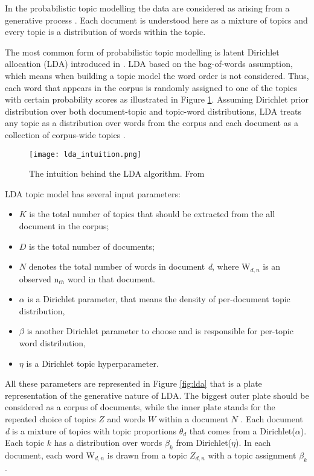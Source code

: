 \documentclass[fontsize=12pt,a4paper,twoside,openany]{scrbook}
\begin{document}
In the probabilistic topic modelling the data are considered as arising from a generative process \parencite{Blei12}. Each document is understood here as a mixture of topics and every topic is a distribution of words within the topic. 

The most common form of probabilistic topic modelling is latent Dirichlet allocation (LDA) introduced in \parencite{Blei03}. LDA based on the bag-of-words assumption, which means when building a topic model the word order is not considered. Thus, each word that appears in the corpus is randomly assigned to one of the topics  with certain probability scores as illustrated in Figure \ref{fig:lda_intuition}. Assuming Dirichlet prior distribution over both document-topic and topic-word distributions, LDA treats any topic as a distribution over words from the corpus and each document as a collection of corpus-wide topics \parencite{Blei03}.

\begin{figure}[h]
\centering
\texttt{[image: lda\_intuition.png]}
\caption{The intuition behind the LDA algorithm. From \parencite{Blei12}}
\label{fig:lda_intuition}
\end{figure}

LDA topic model has several input parameters:
\begin{itemize}
  \item \(K\) is the total number of topics that should be extracted from the all document in the corpus;
  \item \(D\) is the total number of documents;
  \item \(N\) denotes the total number of words in document \emph{d}, where W\(_{d,n}\) is an observed n\(_{th}\) word in that document.
  \item \(\alpha\) is a Dirichlet parameter, that means the density of per-document topic distribution,
  \item \(\beta\) is another Dirichlet parameter to choose and is responsible for per-topic word distribution,
  \item \(\eta\) is a Dirichlet topic hyperparameter.
\end{itemize}

All these parameters are represented in Figure \ref{fig:lda} that is a plate representation of the generative nature of LDA. The biggest outer plate should be considered as a corpus of documents, while the inner plate stands for the repeated choice of topics \(Z\) and words \(W\) within a document \(N\) \parencite[see also][p.~997]{Blei12}. Each document \emph{d} is a mixture of topics with topic proportions \(\theta_{d}\) that comes from a Dirichlet(\(\alpha\)). Each topic \(k\) has a distribution over words \(\beta_{k}\) from Dirichlet(\(\eta\)). In each document, each word W\(_{d,n}\) is drawn from a topic \(Z_{d,n}\) with a topic assignment \(\beta_{k}\). 
\end{document}

